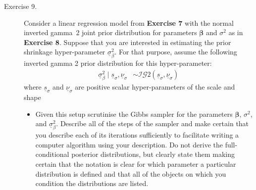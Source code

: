 \documentclass[12pt]{article}
\begin{document}
\begin{adjustwidth}{1cm}{1cm}
\begin{description}
\bigskip\item[Exercise 9.] Consider a linear regression model from \textbf{Exercise 7} with the normal inverted gamma~2 joint prior distribution for parameters $\boldsymbol\beta$ and $\sigma^2$ as in \textbf{Exercise 8}. Suppose that you are interested in estimating the prior shrinkage hyper-parameter $\underline{\sigma}_\beta^2$. For that purpose, assume the following inverted gamma 2 prior distribution for this hyper-parameter:
\begin{align}
\underline{\sigma}^2_\beta \mid \underline{s}_\sigma,\underline{\nu}_\sigma &\sim\mathcal{IG}2(\underline{s}_\sigma,\underline{\nu}_\sigma)
\end{align}
where $\underline{s}_\sigma$ and $\underline{\nu}_\sigma$ are positive scalar hyper-parameters of the scale and shape 
\begin{itemize}
\item Given this setup scrutinise the Gibbs sampler for the parameters $\boldsymbol\beta$, $\sigma^2$, and $\underline{\sigma}^2_\beta$. Describe all of the steps of the sampler and make certain that you describe each of its iterations sufficiently to facilitate writing a computer algorithm using your description. Do not derive the full-conditional posterior distributions, but clearly state them making certain that the notation is clear for which parameter a particular distribution is defined and that all of the objects on which you condition the distributions are listed.
\end{itemize}


\end{description} 



\end{adjustwidth}
\end{document}
